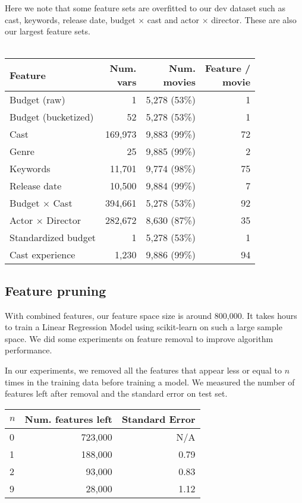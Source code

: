 \documentclass[journal]{IEEEtran}
\begin{document}
\par Here we note that some feature sets are overfitted to our dev dataset such as
cast, keywords, release date, budget $\times$ cast and actor $\times$ director.
These are also our largest feature sets.\\
\\
\begin{tabular}{|l| r r r|} %
\hline
Feature             & \shortstack[c]{Num.\\vars} & \shortstack[c]{Num.\\movies} & \shortstack[c]{Feature / \\ movie}  \\ [0.5ex] %
\hline
Budget (raw)        & 1 & 5,278 (53\%) & 1 \\ %
Budget (bucketized) & 52 & 5,278 (53\%) & 1 \\
Cast                & 169,973 & 9,883 (99\%) & 72 \\
Genre               & 25 & 9,885 (99\%) & 2 \\
Keywords            & 11,701 & 9,774 (98\%) & 75 \\
Release date        & 10,500 & 9,884 (99\%) & 7 \\
\hline
Budget $\times$ Cast & 394,661 & 5,278 (53\%) & 92 \\
Actor $\times$ Director & 282,672 & 8,630 (87\%) & 35 \\
\hline
Standardized budget & 1 & 5,278 (53\%) & 1 \\
Cast experience & 1,230 & 9,886 (99\%) & 94 \\
\hline %
\end{tabular}

\subsection{Feature pruning}
With combined features, our feature space size is around 800,000. It takes hours to train a Linear Regression Model using scikit-learn \cite{scikit} on such a large sample space. We did some experiments on feature removal to improve algorithm performance.
\\
\par In our experiments, we removed all the features that appear less or equal to $n$ times in the training data before training a model. We measured the number of features left after removal and the standard error on test set.\\
\begin{center}
\begin{tabular}{|l| r r|} %
\hline
$n$ & Num. features left & Standard Error  \\ [0.5ex] %
\hline
0 & 723,000 & N/A \\
1 & 188,000 & 0.79 \\
2 & 93,000  & 0.83 \\
9 & 28,000  & 1.12 \\
\hline %
\end{tabular}
\end{center}
\smallskip
\end{document}
